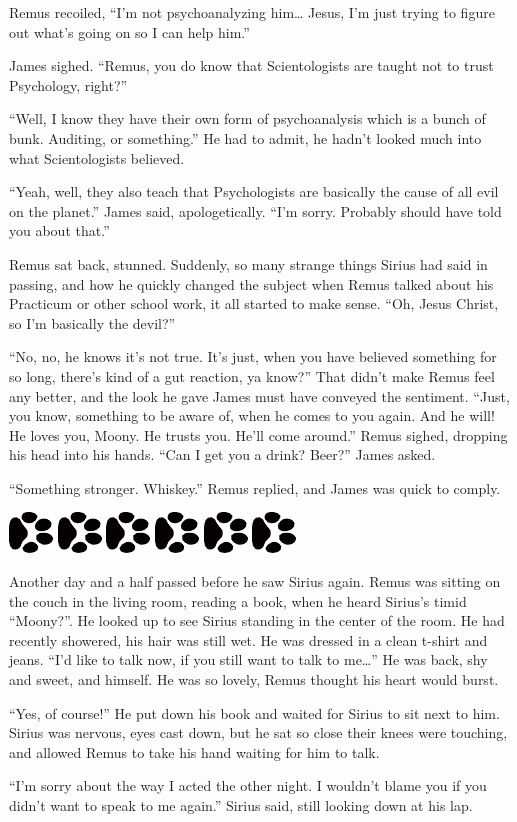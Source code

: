 \documentclass[12pt,twoside,openright]{memoir}
\newcommand{\dogPrintRule}{	
	\begin{center}
		\hspace{.5em}
		\includegraphics[angle=60]{dogprint.pdf}
		\hspace{.5em}
		\includegraphics[angle=120]{dogprint.pdf}
		\hspace{.5em}
		\includegraphics[angle=60]{dogprint.pdf}
		\hspace{.5em}
		\includegraphics[angle=120]{dogprint.pdf}
		\hspace{.5em}
		\includegraphics[angle=60]{dogprint.pdf}
		\hspace{.5em}
		\includegraphics[angle=120]{dogprint.pdf}
		\hspace{.5em}
	\end{center}
}
\begin{document}
Remus recoiled, ``I'm not psychoanalyzing him… Jesus, I'm just trying to figure out what's going on so I can help him.''

James sighed. ``Remus, you do know that Scientologists are taught not to trust Psychology, right?''

``Well, I know they have their own form of psychoanalysis which is a bunch of bunk. Auditing, or something.'' He had to admit, he hadn't looked much into what Scientologists believed.

``Yeah, well, they also teach that Psychologists are basically the cause of all evil on the planet.'' James said, apologetically. ``I'm sorry. Probably should have told you about that.''

Remus sat back, stunned. Suddenly, so many strange things Sirius had said in passing, and how he quickly changed the subject when Remus talked about his Practicum or other school work, it all started to make sense. ``Oh, Jesus Christ, so I'm basically the devil?''

``No, no, he knows it's not true. It's just, when you have believed something for so long, there's kind of a gut reaction, ya know?'' That didn't make Remus feel any better, and the look he gave James must have conveyed the sentiment. ``Just, you know, something to be aware of, when he comes to you again. And he will! He loves you, Moony. He trusts you. He'll come around.'' Remus sighed, dropping his head into his hands. ``Can I get you a drink? Beer?'' James asked.

``Something stronger. Whiskey.'' Remus replied, and James was quick to comply.

\dogPrintRule

Another day and a half passed before he saw Sirius again. Remus was sitting on the couch in the living room, reading a book, when he heard Sirius's timid ``Moony?''. He looked up to see Sirius standing in the center of the room. He had recently showered, his hair was still wet. He was dressed in a clean t-shirt and jeans. ``I'd like to talk now, if you still want to talk to me…'' He was back, shy and sweet, and himself. He was so lovely, Remus thought his heart would burst.

``Yes, of course!'' He put down his book and waited for Sirius to sit next to him. Sirius was nervous, eyes cast down, but he sat so close their knees were touching, and allowed Remus to take his hand waiting for him to talk.

``I'm sorry about the way I acted the other night. I wouldn't blame you if you didn't want to speak to me again.'' Sirius said, still looking down at his lap.
\end{document}
